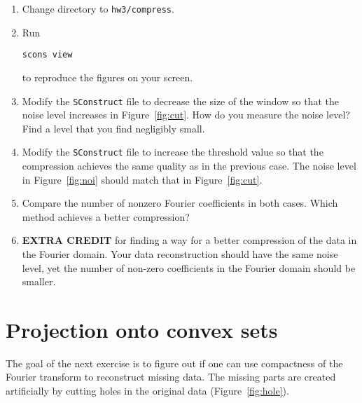 \begin{enumerate}
\item Change directory to \texttt{hw3/compress}.
\item Run 
\begin{verbatim}
scons view
\end{verbatim}
to reproduce the figures on your screen.
\item Modify the \texttt{SConstruct} file to decrease the size of the window so that the noise level increases in Figure~\ref{fig:cut}. How do you measure the noise level? Find a level that you find negligibly small.
\item Modify the \texttt{SConstruct} file to increase the threshold value so that the compression achieves the same quality as in the previous case. The noise level in Figure~\ref{fig:noi} should match that in Figure~\ref{fig:cut}.
\item Compare the number of nonzero Fourier coefficients in both cases. Which method achieves a better compression?
\item \textbf{EXTRA CREDIT} for finding a way for a better compression of the data in the Fourier domain. Your data reconstruction should have 
the same noise level, yet the number of non-zero coefficients in the Fourier domain should be smaller.
\end{enumerate}

\lstset{language=python,numbers=left,numberstyle=\tiny,showstringspaces=false}


\section{Projection onto convex sets}


The goal of the next exercise is to figure out if one can use compactness
of the Fourier transform to reconstruct missing data. The missing
parts are created artificially by cutting holes in the original data
(Figure~\ref{fig:hole}).




